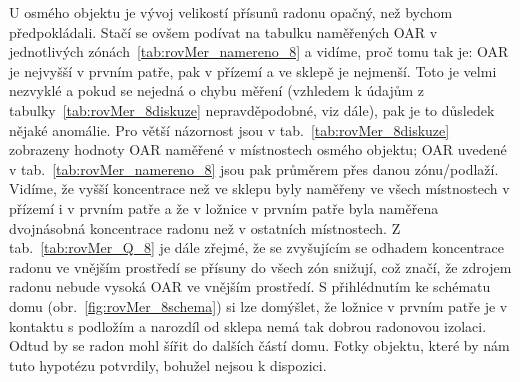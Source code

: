 U osmého objektu je vývoj velikostí přísunů radonu opačný, než bychom předpokládali. Stačí se ovšem podívat na tabulku naměřených OAR v jednotlivých zónách~\ref{tab:rovMer_namereno_8} a vidíme, proč tomu tak je: OAR je nejvyšší v prvním patře, pak v přízemí a ve sklepě je nejmenší. Toto je velmi nezvyklé a pokud se nejedná o chybu měření (vzhledem k údajům z tabulky~\ref{tab:rovMer_8diskuze} nepravděpodobné, viz dále), pak je to důsledek nějaké anomálie. Pro větší názornost jsou v tab.~\ref{tab:rovMer_8diskuze} zobrazeny hodnoty OAR naměřené v místnostech osmého objektu; OAR uvedené v tab.~\ref{tab:rovMer_namereno_8} jsou pak průměrem přes danou zónu/podlaží. Vidíme, že vyšší koncentrace než ve sklepu byly naměřeny ve všech místnostech v přízemí i v prvním patře a že v ložnice v prvním
patře byla naměřena dvojnásobná koncentrace radonu než v ostatních místnostech. Z tab.~\ref{tab:rovMer_Q_8} je dále zřejmé, že se zvyšujícím se odhadem koncentrace radonu ve vnějším prostředí se přísuny do všech zón snižují, což značí, že zdrojem radonu nebude vysoká OAR ve vnějším prostředí. S přihlédnutím ke schématu domu (obr.~\ref{fig:rovMer_8schema}) si lze domýšlet, že ložnice v prvním patře je v kontaktu s podložím a narozdíl od sklepa nemá tak dobrou radonovou izolaci. Odtud by se radon mohl šířit do dalších částí domu. Fotky objektu, které by nám tuto hypotézu potvrdily, bohužel nejsou k dispozici.

